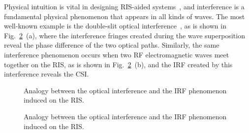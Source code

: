 \documentclass[journal,twocolumn]{IEEEtran}
\theoremstyle{nonumberplain}
\begin{document}
    Physical intuition is vital in designing RIS-aided systems~\cite{najafi2020physics}, and interference is a fundamental physical phenomenon that appears in all kinds of waves. The most well-known example is the double-slit optical interference~\cite{louradour1993interference}, as is shown in Fig.~\ref{fig:scheme}~(a), where the interference fringes created during the wave superposition reveal the phase difference of the two optical paths. Similarly, the same interference phenomenon occurs when two RF electromagnetic waves meet together on the RIS, as is shown in Fig.~\ref{fig:scheme}~(b), and the \ac{IRF} created by this interference reveals the \ac{CSI}. 
    \ifx\onecol\undefined
    \begin{figure}[t]
        \centering
        \caption{Analogy between the optical interference and the \ac{IRF} phenomenon induced on the RIS.}
        \label{fig:scheme}
    \end{figure}
    \else 
        \begin{figure}[t]
            \centering
            \caption{Analogy between the optical interference and the \ac{IRF} phenomenon induced on the RIS.}
            \label{fig:scheme}
        \end{figure}
    \fi
\end{document}
